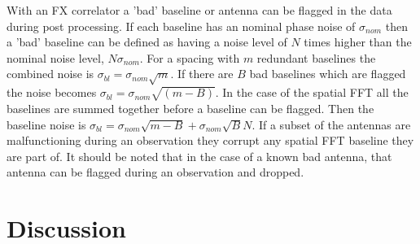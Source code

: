 \documentclass[useAMS,macros,usenatbib,onecolumn]{mn2e}
\begin{document}
With an FX correlator a 'bad' baseline or antenna can be flagged in the data during post processing.
If each baseline has an nominal phase noise of $\sigma_{nom}$ then a 'bad' baseline can be defined as having a noise level of $N$ times higher than the nominal noise level, $N\sigma_{nom}$.
For a spacing with $m$ redundant baselines the combined noise is $\sigma_{bl}=\sigma_{nom}\sqrt{m}$.
If there are $B$ bad baselines which are flagged the noise becomes $\sigma_{bl}=\sigma_{nom}\sqrt{(m-B)}$.
In the case of the spatial FFT all the baselines are summed together before a baseline can be flagged.
Then the baseline noise is $\sigma_{bl}=\sigma_{nom}\sqrt{m-B}+\sigma_{nom}\sqrt{B}N$.
If a subset of the antennas are malfunctioning during an observation they corrupt any spatial FFT baseline they are part of.
It should be noted that in the case of a known bad antenna, that antenna can be flagged during an observation and dropped.

\section{Discussion}
\label{discussion}


{}

\end{document}
